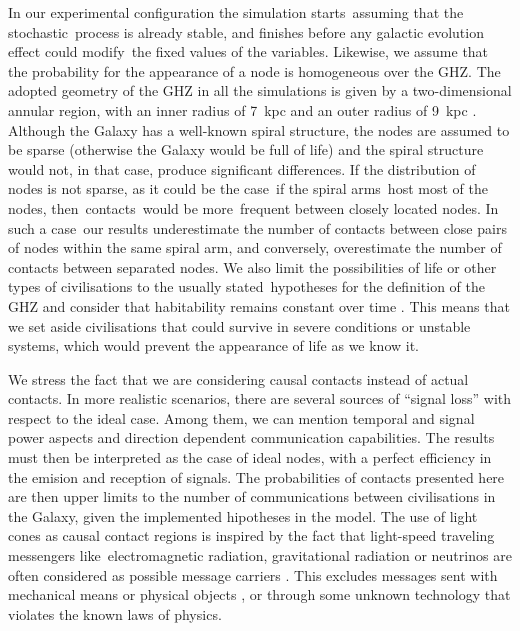 \documentclass[crop]{CSLB}
\newcommand{\ceti}{node}
\newcommand{\cetis}{nodes}
\begin{document}
In our experimental configuration the simulation starts assuming that the
stochastic process is already stable, and finishes before any galactic
evolution effect could modify the fixed values of the variables.
%
Likewise, we assume that the probability for the appearance of a \ceti{} is
homogeneous over the GHZ.
%
The adopted geometry of the GHZ in all the simulations is given by a 
two-dimensional annular region,
with an inner radius of 7~kpc and an outer radius of 9~kpc
\citep{lineweaver_galactic_2004}.
%
Although the Galaxy has a well-known spiral structure, the nodes are assumed
to be sparse (otherwise the Galaxy would be full of life) and the spiral
structure would not, in that case, produce significant differences.
%
If the distribution of nodes is not sparse, as it could be the case if the
spiral arms host most of the \cetis{}, then contacts would be more frequent
between closely located nodes.
%
In such a case our results underestimate the number of contacts between
close pairs of nodes within the same spiral arm, and conversely, overestimate
the number of contacts between separated nodes.
%
We also limit the possibilities of life or other types of civilisations to the
usually stated hypotheses for the definition of the GHZ
\citep{dayal_habitability_2016, gonzalez_galactic_2001,
lineweaver_galactic_2004, gonzalez_habitable_2005, morrison_extending_2015,
haqq-misra_evolution_2019, rahvar_cosmic_2016, gobat_evolution_2016,
rahvar_cosmic_2016} and consider that habitability remains constant over time
\citep[see, however, ][]{gonzalez_habitable_2005, dayal_habitability_2016,
gobat_evolution_2016}.
%
This means that we set aside civilisations that could survive in severe
conditions or unstable systems, which would prevent the appearance of life as
we know it.  



We stress the fact that we are
considering causal contacts instead of actual contacts.
%
In more realistic scenarios, there are several sources of ``signal loss'' with
respect to the ideal case.
%
Among them, we can mention temporal and signal power aspects and direction
dependent communication capabilities.
%
The results must then be interpreted as the case of ideal nodes, with a perfect
efficiency in the emision and reception of signals.
%
The probabilities of contacts presented here are then upper limits to the
number of communications between civilisations in the Galaxy, given the
implemented hipotheses in the model.
%
The use of light cones as causal contact regions is inspired by the fact that
light-speed traveling messengers like electromagnetic radiation, gravitational
radiation or neutrinos are often considered as possible message carriers
\citep{hippke_interstellar_2017, wright_how_2018}.
%
This excludes messages sent with mechanical means or physical objects
\citep[e.g., ][]{Armstrong2013, barlow_galactic_2013}, or through some unknown
technology that violates the known laws of physics.
\end{document}
